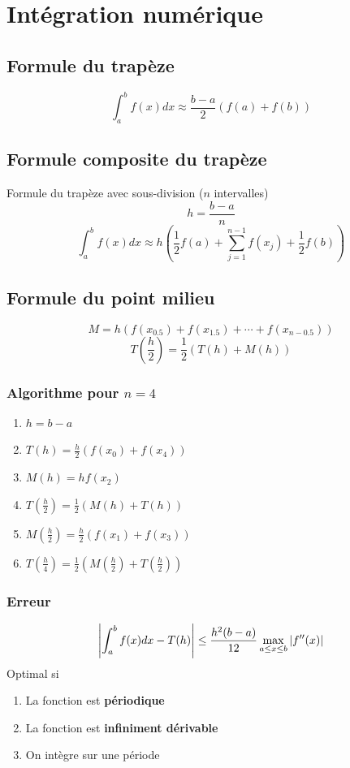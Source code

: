 \documentclass[resume]{subfiles}
\begin{document}
    \section{Intégration numérique}
	\subsection{Formule du trapèze}
	$$\boxed{\int_{a}^{b}f(x)dx\approx \frac{b-a}{2}\left(f(a)+f(b)\right)}$$
	\subsection{Formule composite du trapèze}
Formule du trapèze avec sous-division ($n$ intervalles)
$$h=\frac{b-a}{n}$$
$$\boxed{\int_{a}^{b}f(x)dx\approx h\left(\frac{1}{2}f(a)+\sum_{j=1}^{n-1}f(x_j)+\frac{1}{2}f(b)\right)}$$
	\subsection{Formule du point milieu}
	$$\boxed{M=h\left(f(x_{0.5})+f(x_{1.5})+\cdots+f(x_{n-0.5 })\right)}$$
	$$T\left(\frac{h}{2}\right)=\frac{1}{2}\left(T(h)+M(h)\right)$$
	\subsubsection{Algorithme pour $n=4$}
	\begin{enumerate}
	\item $h=b-a$
	\item $T(h)=\frac{h}{2}\left(f(x_0)+f(x_4)\right)$
	\item $M(h)=hf(x_2)$
	\item $T\left(\frac{h}{2}\right)=\frac{1}{2}\left(M(h)+T(h)\right)$
	\item $M\left(\frac{h}{2}\right)=\frac{h}{2}\left(f(x_1)+f(x_3)\right)$
	\item $T\left(\frac{h}{4}\right)=\frac{1}{2}\left(M\left(\frac{h}{2}\right)+T\left(\frac{h}{2}\right)\right)$
	\end{enumerate}
	\subsubsection{Erreur}
	$$\abs{\int_a^bf(x)dx-T(h)}\leq \frac{h^2(b-a)}{12}\max_{a\leq x\leq b}\abs{f''(x)}$$
	Optimal si
	\begin{enumerate}
	\item La fonction est \textbf{périodique}
	\item La fonction est \textbf{infiniment dérivable}
	\item On intègre sur une période
	\end{enumerate}
\end{document}
